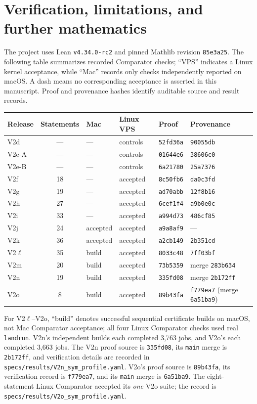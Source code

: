 \documentclass[11pt]{article}
\newcommand{\code}[1]{\texttt{#1}}
\begin{document}
\section{Verification, limitations, and further mathematics}
The project uses Lean \code{v4.34.0-rc2} and pinned Mathlib revision
\code{85e3a25}. The following table summarizes recorded Comparator checks;
``VPS'' indicates a Linux kernel acceptance, while ``Mac'' records only
checks independently reported on macOS. A dash means no corresponding
acceptance is asserted in this manuscript. Proof and provenance hashes
identify auditable source and result records.
\begin{center}
\small
\setlength{\tabcolsep}{4pt}
\begin{tabular}{@{}lcllll@{}}
\hline
Release & Statements & Mac & Linux VPS & Proof & Provenance\\
\hline
V2d & --- & --- & controls & \code{52fd36a} & \code{90055db}\\
V2e-A & --- & --- & controls & \code{01644e6} & \code{38606c0}\\
V2e-B & --- & --- & controls & \code{6a21780} & \code{25a7376}\\
V2f & 18 & --- & accepted & \code{8c50fb6} & \code{da0c3fd}\\
V2g & 19 & --- & accepted & \code{ad70abb} & \code{12f8b16}\\
V2h & 27 & --- & accepted & \code{6cef1f4} & \code{a9b0e0c}\\
V2i & 33 & --- & accepted & \code{a994d73} & \code{486cf85}\\
V2j & 24 & accepted & accepted & \code{a9a8af9} & ---\\
V2k & 36 & accepted & accepted & \code{a2cb149} & \code{2b351cd}\\
V2\ensuremath{\ell} & 35 & build & accepted & \code{8033c48} & \code{7ff03bf}\\
V2m & 20 & build & accepted & \code{73b5359} & merge \code{283b634}\\
V2n & 19 & build & accepted & \code{335fd08} & merge \code{2b172ff}\\
V2o & 8 & build & accepted & \code{89b43fa} & \code{f779ea7} (merge \code{6a51ba9})\\
\hline
\end{tabular}
\end{center}
For V2\ensuremath{\ell}--V2o, ``build'' denotes successful sequential certificate
builds on macOS, not Mac Comparator acceptance; all four Linux Comparator
checks used real \code{landrun}. V2n's independent builds each completed 3,763 jobs,
and V2o's each completed 3,663 jobs.
The V2n proof source is \code{335fd08}, its \code{main} merge is
\code{2b172ff}, and verification details are recorded in
\nolinkurl{specs/results/V2n_sym_profile.yaml}. V2o's proof source is
\code{89b43fa}, its verification record is \code{f779ea7}, and its
\code{main} merge is \code{6a51ba9}. The eight-statement Linux
Comparator accepted its \emph{one} V2o suite; the record is
\nolinkurl{specs/results/V2o_sym_profile.yaml}.
\end{document}
